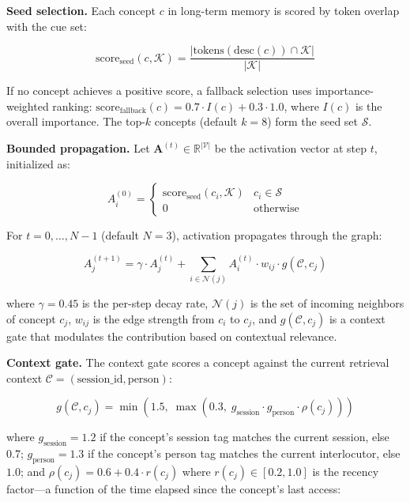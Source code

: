 \documentclass[11pt,twocolumn]{article}
\begin{document}
\textbf{Seed selection.} Each concept $c$ in long-term memory is scored by token overlap with the cue set:

\begin{equation}
\text{score}_{\text{seed}}(c, \mathcal{K}) = \frac{|\text{tokens}(\text{desc}(c)) \cap \mathcal{K}|}{|\mathcal{K}|}
\label{eq:seed_score}
\end{equation}

If no concept achieves a positive score, a fallback selection uses importance-weighted ranking: $\text{score}_{\text{fallback}}(c) = 0.7 \cdot I(c) + 0.3 \cdot 1.0$, where $I(c)$ is the overall importance. The top-$k$ concepts (default $k = 8$) form the seed set $\mathcal{S}$.

\textbf{Bounded propagation.} Let $\mathbf{A}^{(t)} \in \mathbb{R}^{|\mathcal{V}|}$ be the activation vector at step $t$, initialized as:

\begin{equation}
A_i^{(0)} = \begin{cases}
\text{score}_{\text{seed}}(c_i, \mathcal{K}) & c_i \in \mathcal{S} \\
0 & \text{otherwise}
\end{cases}
\label{eq:init_activation}
\end{equation}

For $t = 0, \ldots, N-1$ (default $N = 3$), activation propagates through the graph:

\begin{equation}
A_j^{(t+1)} = \gamma \cdot A_j^{(t)} + \sum_{i \in \mathcal{N}(j)} A_i^{(t)} \cdot w_{ij} \cdot g(\mathcal{C}, c_j)
\label{eq:spreading}
\end{equation}

where $\gamma = 0.45$ is the per-step decay rate, $\mathcal{N}(j)$ is the set of incoming neighbors of concept $c_j$, $w_{ij}$ is the edge strength from $c_i$ to $c_j$, and $g(\mathcal{C}, c_j)$ is a context gate that modulates the contribution based on contextual relevance.

\textbf{Context gate.} The context gate scores a concept against the current retrieval context $\mathcal{C} = (\text{session\_id}, \text{person})$:

\begin{equation}
g(\mathcal{C}, c_j) = \min\left(1.5,\; \max(0.3,\; g_{\text{session}} \cdot g_{\text{person}} \cdot \rho(c_j))\right)
\label{eq:gate}
\end{equation}

where $g_{\text{session}} = 1.2$ if the concept's session tag matches the current session, else $0.7$; $g_{\text{person}} = 1.3$ if the concept's person tag matches the current interlocutor, else $1.0$; and $\rho(c_j) = 0.6 + 0.4 \cdot r(c_j)$ where $r(c_j) \in [0.2, 1.0]$ is the recency factor---a function of the time elapsed since the concept's last access:
\end{document}
